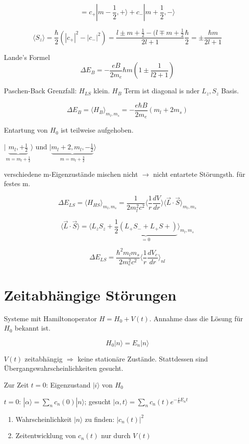 \[ = c_+|m-\frac{1}{2},+\rangle + c_-|m+\frac{1}{2},-\rangle\]

\[ \langle S_z\rangle = \frac{\hbar}{2}(|c_+|^2-|c_-|^2)= \frac{l\pm m+\frac{1}{2}-(l\mp m+\frac{1}{2}}{2l+1}\frac{\hbar}{2}=\pm \frac{\hbar m}{2l+1}\]

Lande's Formel
\[\boxed{\Delta E_B = -\frac{eB}{2m_e}\hbar m(1\pm \frac{1}{l2+1})}\]

Paschen-Back Grenzfall: \(H_{LS}\) klein. \(H_B\) Term ist diagonal is nder \(L_z,S_z\) Basis.

\[ \Delta E_B = \langle H_B\rangle_{m_l,m_s} = -\frac{e\hbar B}{2m_e}(m_l + 2m_s)\]

Entartung von \(H_0\) ist teilweise aufgehoben.

\( |\underbrace{m_l,+\frac{1}{2}}_{m=m_l+\frac{1}{2}}\rangle\) und \(|\underbrace{ m_l+2,m_l,-\frac{1}{2}}_{m=m_l+\frac{3}{2}}\rangle\)

verschiedene m-Eigenzustände mischen nicht \(\rightarrow\) nicht entartete Störungsth. für festes m.

\[\Delta E_{LS} = \langle H_{HS} \rangle_{m_l,m_s} = \frac{1}{2m^2_lc^2}\langle \frac{1}{r} \frac{dV}{dr}\rangle\langle\vec L\cdot\vec S\rangle_{m_l,m_s}\]

\[\langle\vec L\cdot\vec S\rangle = \langle L_zS_z + \underbrace{\frac{1}{2}(L_+S_-+L_+S+)}_{=0}\rangle_{m_l,m_s}\]

\[ \boxed{\Delta E_{LS} = \frac{\hbar^2 m_lm_s}{2m^2_ec^2}\langle\frac{1}{r}\frac{dV_c}{dr}\rangle_{nl}}\]


\section{Zeitabhängige Störungen}

Systeme mit Hamiltonoperator \(H=H_0+V(t)\). Annahme dass die Lösung für \(H_0\) bekannt ist.

\[ H_0 |n\rangle = E_n|n\rangle\]

\(V(t)\) zeitabhängig \(\Rightarrow\) keine stationäre Zustände. Stattdessen sind Übergangswahrscheinlichkeiten gesucht.

Zur Zeit \(t=0\): Eigenzustand \(|i\rangle\) von \(H_0\)

\(t=0\): \(|\alpha\rangle = \sum_n c_n(0)|n\rangle\); gesucht \(|\alpha,t\rangle = \sum_n c_n(t)e^{-\frac{i}{\hbar}E_n t}\)

\begin{enumerate}
\item Wahrscheinlichkeit \(|n\rangle\) zu finden: \(|c_n(t)|^2\)
\item Zeitentwicklung von \(c_n(t)\) nur durch \(V(t)\)
\end{enumerate}

